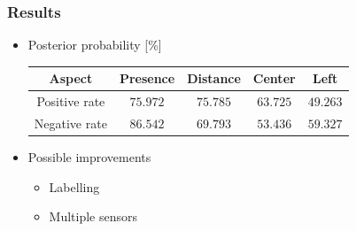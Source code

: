 \documentclass[10pt,xcolor=pdflatex]{beamer}
\begin{document}
\begin{frame}\frametitle{Results}
    \begin{itemize}
        \item Posterior probability [\%] 
    \begin{center}
        \begin{tabular}{|c|c c c c|} \hline
            \textbf{Aspect} & \textbf{Presence} & \textbf{Distance} & \textbf{Center}       & \textbf{Left} \\ \hline
            Positive rate   & $75.972$          & $75.785$          & $63.725$              & $49.263$            \\
            Negative rate   & $86.542$          & $69.793$          & $53.436$              & $59.327$            \\ \hline
        \end{tabular}
    \end{center}
        \item Possible improvements
            \begin{itemize}
                \item Labelling
                \item Multiple sensors
            \end{itemize}
    \end{itemize}

\end{frame}


\end{document}
